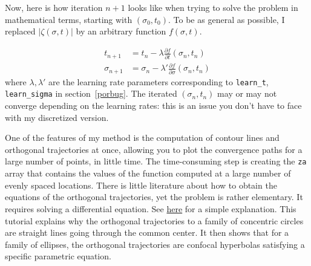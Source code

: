 \documentclass[oneside,10pt]{book}
\begin{document}
Now, here is how iteration $n+1$ looks like when trying to solve the problem in mathematical terms, starting with $(\sigma_0,t_0)$. To be as general as possible, I replaced $|\zeta(\sigma,t)|$ by an arbitrary function $f(\sigma,t)$.

$$
\begin{aligned}
      t_{n+1} & = t_n - \lambda \frac{\partial f}{\partial t} (\sigma_n, t_n)\\
      \sigma_{n+1} & = \sigma_n - \lambda' \frac{\partial f}{\partial \sigma} (\sigma_n, t_n)
\end{aligned}
$$
where $\lambda,\lambda'$ are the learning rate parameters corresponding to \texttt{learn\_t}, \texttt{learn\_sigma} in section~\ref{porbug}.
The iterated $(\sigma_n,t_n)$ may or may not converge depending on the learning rates: this is an issue you don't have to face with my
 discretized version.

One of the features of my method is the computation of contour lines and orthogonal trajectories at once, allowing you to plot the convergence paths for a large number of points, in little time. The time-consuming step is creating the \texttt{za} array that contains the values of the function  computed at a large number of evenly spaced locations. There is little literature about how to obtain the equations of the orthogonal trajectories, yet the problem is rather elementary. It requires solving a differential equation. See \href{https://math24.net/orthogonal-trajectories.html}{here} for a simple explanation. This tutorial explains  why the orthogonal trajectories to a family of concentric circles are straight lines going through the common center. It then shows that for a family of ellipses, the orthogonal trajectories are confocal hyperbolas satisfying a specific parametric equation.
\end{document}
